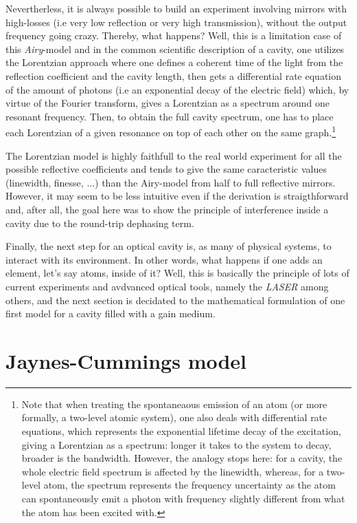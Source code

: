 \documentclass[12pt]{report}
\begin{document}
Nevertherless, it is always possible to build an experiment involving mirrors with high-losses (i.e very low reflection or very high transmission), without the output frequency going crazy. Thereby, what happens? Well, this is a limitation case of this \textit{Airy}-model and in the common scientific description of a cavity, one utilizes the Lorentzian approach where one defines a coherent time of the light from the reflection coefficient and the cavity length, then gets a differential rate equation of the amount of photons (i.e an exponential decay of the electric field) which, by virtue of the Fourier transform, gives a Lorentzian as a spectrum around one resonant frequency. Then, to obtain the full cavity spectrum, one has to place each Lorentzian of a given resonance on top of each other on the same graph.\footnote{Note that when treating the spontaneaous emission of an atom (or more formally, a two-level atomic system), one also deals with differential rate equations, which represents the exponential lifetime decay of the excitation, giving a Lorentzian as a spectrum: longer it takes to the system to decay, broader is the bandwidth. However, the analogy stops here: for a cavity, the whole electric field spectrum is affected by the linewidth, whereas, for a two-level atom, the spectrum represents the frequency uncertainty as the atom can spontaneously emit a photon with frequency slightly different from what the atom has been excited with.}

The Lorentzian model is highly faithfull to the real world experiment for all the possible reflective coefficients and tends to give the same caracteristic values (linewidth, finesse, ...) than the Airy-model from half to full reflective mirrors. However, it may seem to be less intuitive even if the derivation is straigthforward and, after all, the goal here was to show the principle of interference inside a cavity due to the round-trip dephasing term.

Finally, the next step for an optical cavity is, as many of physical systems, to interact with its environment. In other words, what happens if one adds an element, let's say atoms, inside of it? Well, this is basically the principle of lots of current experiments and avdvanced optical tools, namely the \textit{LASER} among others, and the next section is decidated to the mathematical formulation of one first model for a cavity filled with a gain medium.

\section{Jaynes-Cummings model}
\end{document}
